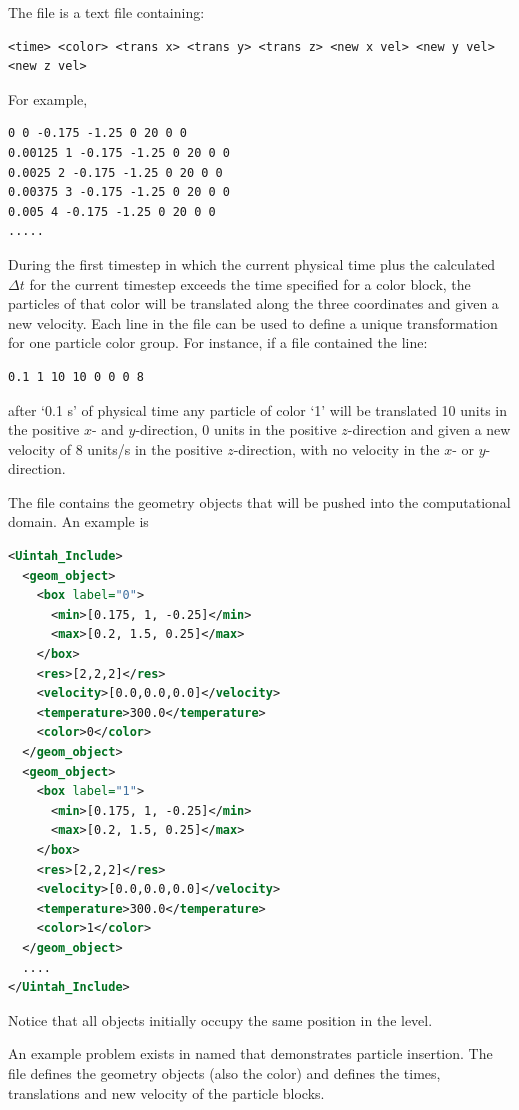 The  file is a text file containing:
\begin{lstlisting}[backgroundcolor=\color{background}]
<time> <color> <trans x> <trans y> <trans z> <new x vel> <new y vel> <new z vel>
\end{lstlisting}  
For example,
\begin{lstlisting}[backgroundcolor=\color{background}]
0 0 -0.175 -1.25 0 20 0 0
0.00125 1 -0.175 -1.25 0 20 0 0
0.0025 2 -0.175 -1.25 0 20 0 0
0.00375 3 -0.175 -1.25 0 20 0 0
0.005 4 -0.175 -1.25 0 20 0 0
.....
\end{lstlisting}  

During the first timestep in which the current physical time plus the calculated 
$\Delta t$ for the current timestep exceeds the time specified for a color block, the 
particles of that color will be translated along the three coordinates and given 
a new velocity.  Each line in the file can be used to define a unique transformation
for one particle color group.  For instance, if a file contained the line:
\begin{lstlisting}[backgroundcolor=\color{background}]
0.1 1 10 10 0 0 0 8 
\end{lstlisting}
\noindent after `0.1 s' of physical time any particle of color `1' will be translated 10 
units in the positive $x$- and $y$-direction, 0 units in the positive $z$-direction 
and given a new velocity of 8 units/s in the positive $z$-direction, with no 
velocity in the $x$- or $y$-direction.

The  file contains the geometry objects that
will be pushed into the computational domain.  An example is
\begin{lstlisting}[language=XML]
<Uintah_Include>
  <geom_object>
    <box label="0">
      <min>[0.175, 1, -0.25]</min>
      <max>[0.2, 1.5, 0.25]</max>
    </box>
    <res>[2,2,2]</res>
    <velocity>[0.0,0.0,0.0]</velocity>
    <temperature>300.0</temperature>
    <color>0</color>
  </geom_object>
  <geom_object>
    <box label="1">
      <min>[0.175, 1, -0.25]</min>
      <max>[0.2, 1.5, 0.25]</max>
    </box>
    <res>[2,2,2]</res>
    <velocity>[0.0,0.0,0.0]</velocity>
    <temperature>300.0</temperature>
    <color>1</color>
  </geom_object>
  ....
</Uintah_Include>
\end{lstlisting}
Notice that all objects initially occupy the same position in the  level.

An example problem exists in  named 
 that demonstrates particle insertion. The 
 file defines the geometry objects (also the color) and
 defines the times, translations and new velocity of the 
particle blocks.  


